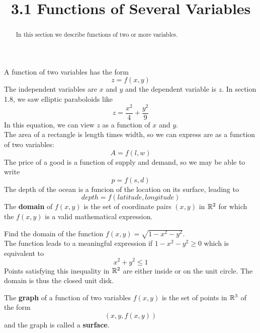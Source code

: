 \documentclass[handout]{ximera}
\title{3.1 Functions of Several Variables}
\begin{document}
\begin{abstract}
In this section we describe functions of two or more variables.
\end{abstract}

\maketitle

A function of two variables has the form
\[
z = f(x, y)
\]
The independent variables are $x$ and $y$ and the dependent variable is $z$. In section 1.8, we saw elliptic paraboloids like
\[
z = \frac{x^2}{4} + \frac{y^2}{9}
\]
In this equation, we can view $z$ as a function of $x$ and $y$.\\
The area of a rectangle is length times width, so we can express are as a function of two variables:
\[
A = f(l, w)
\]
The price of a good is a function of supply and demand, so we may be able to write
\[
p = f(s, d)
\]
The depth of the ocean is a funcion of the location on its surface, leading to
\[
depth = f(latitude, longitude)
\]
The \textbf{domain} of $f(x, y)$ is the set of coordinate pairs $(x, y)$ in $\mathbb R^2$ for which the $f(x, y)$ is a valid mathematical expression.

\begin{example}[Example 1]
Find the domain of the function $f(x, y) = \sqrt{1 - x^2 - y^2}$.\\
The function leads to a meaningful expression if $1 - x^2 - y^2 \geq 0$ which  is equivalent to 
\[
x^2 + y^2 \leq 1
\]
Points satisfying this inequality in $\mathbb R^2$ are either inside  or on the unit circle.
The domain is thus the closed unit disk.

\begin{image}
\end{image}


\end{example}

The \textbf{graph} of a function of two variables $f(x, y)$ is the set of points in $\mathbb R^3$ of the form
\[
(x, y, f(x,y))
\]
and the graph is called a \textbf{surface}.
\end{document}

